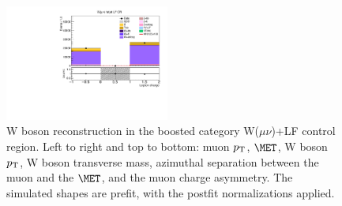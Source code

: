 \begin{figure}[tbp]
\begin{center}
    \includegraphics[width=0.48\textwidth]{figures/wlnhbb2016/boosted/WmnWHLightFlavorFJCR_lepton1Charge.pdf}
    \caption{W boson reconstruction in the boosted category W($\mu\nu$)+LF control region.
    Left to right and top to bottom: muon $p_{\mathrm{T}}$, $\MET$, W boson $p_{\mathrm{T}}$, W boson transverse mass,
    azimuthal separation between the muon and the $\MET$, and the muon charge asymmetry.
    The simulated shapes are prefit, with the postfit normalizations applied.}
    \label{fig:boost_WmnLF_WBosons}
  \end{center}
\end{figure}
\clearpage


